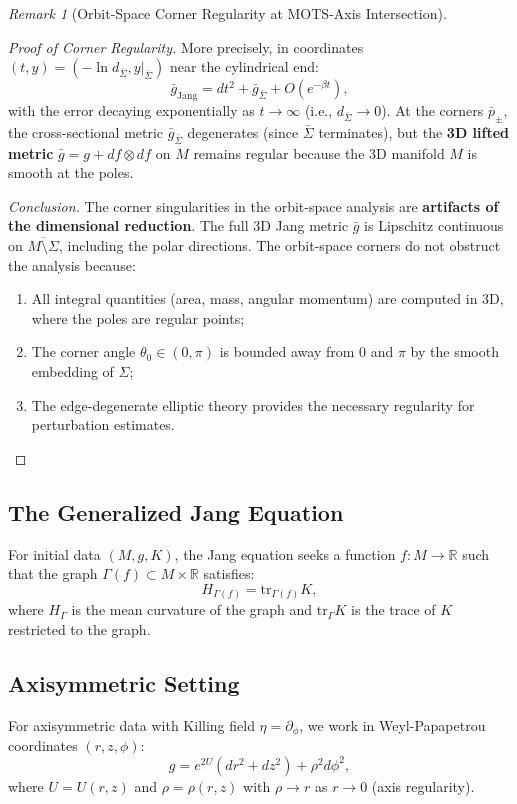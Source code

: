 \documentclass[12pt]{article}
\theoremstyle{plain}
\theoremstyle{definition}
\theoremstyle{remark}
\newtheorem{remark}[theorem]{Remark}
\newcommand{\tr}{\mathrm{tr}}
\newcommand{\bg}{\bar{g}}
\begin{document}
\begin{remark}[Orbit-Space Corner Regularity at MOTS-Axis Intersection]
\begin{proof}[Proof of Corner Regularity]
More precisely, in coordinates $(t, y) = (-\ln d_{\bar{\Sigma}}, y|_{\bar{\Sigma}})$ near the cylindrical end:
\[
\bar{g}_{\text{Jang}} = dt^2 + \bar{g}_{\bar{\Sigma}} + O(e^{-\beta t}),
\]
with the error decaying exponentially as $t \to \infty$ (i.e., $d_{\bar{\Sigma}} \to 0$). At the corners $\bar{p}_\pm$, the cross-sectional metric $\bar{g}_{\bar{\Sigma}}$ degenerates (since $\bar{\Sigma}$ terminates), but the \textbf{3D lifted metric} $\bg = g + df \otimes df$ on $M$ remains regular because the 3D manifold $M$ is smooth at the poles.

\textit{Conclusion.} The corner singularities in the orbit-space analysis are \textbf{artifacts of the dimensional reduction}. The full 3D Jang metric $\bg$ is Lipschitz continuous on $\overline{M \setminus \Sigma}$, including the polar directions. The orbit-space corners do not obstruct the analysis because:
\begin{enumerate}
    \item All integral quantities (area, mass, angular momentum) are computed in 3D, where the poles are regular points;
    \item The corner angle $\theta_0 \in (0, \pi)$ is bounded away from $0$ and $\pi$ by the smooth embedding of $\Sigma$;
    \item The edge-degenerate elliptic theory provides the necessary regularity for perturbation estimates.
\end{enumerate}
\end{proof}
\end{remark}

\subsection{The Generalized Jang Equation}

For initial data $(M, g, K)$, the Jang equation seeks a function $f: M \to \mathbb{R}$ such that the graph $\Gamma(f) \subset M \times \mathbb{R}$ satisfies:
\begin{equation}\label{eq:jang}
H_{\Gamma(f)} = \tr_{\Gamma(f)} K,
\end{equation}
where $H_\Gamma$ is the mean curvature of the graph and $\tr_\Gamma K$ is the trace of $K$ restricted to the graph.

\subsection{Axisymmetric Setting}

For axisymmetric data with Killing field $\eta = \partial_\phi$, we work in Weyl-Papapetrou coordinates $(r, z, \phi)$:
\begin{equation}
g = e^{2U}(dr^2 + dz^2) + \rho^2 d\phi^2,
\end{equation}
where $U = U(r, z)$ and $\rho = \rho(r, z)$ with $\rho \to r$ as $r \to 0$ (axis regularity).
\end{document}
